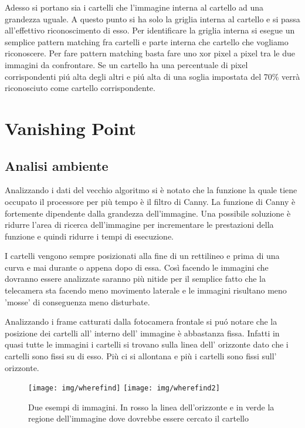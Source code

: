 		Adesso si portano sia i cartelli che l'immagine interna al cartello ad una grandezza uguale. A questo punto si ha solo la griglia interna al cartello e si passa all'effettivo riconoscimento di esso. Per identificare la griglia interna si esegue un semplice pattern matching fra cartelli e parte interna che cartello che vogliamo riconoscere. Per fare pattern matching basta fare uno xor pixel a pixel tra le due immagini da confrontare. Se un cartello ha una percentuale di pixel corrispondenti pi\'u alta degli altri e pi\'u alta di una soglia impostata del 70\% verrà riconosciuto come cartello corrispondente.
		

\section{Vanishing Point}

	\subsection{Analisi ambiente}

		Analizzando i dati del vecchio algoritmo si è notato che la funzione la quale tiene occupato il processore per più tempo è il filtro di Canny. La funzione di Canny è fortemente dipendente dalla grandezza dell'immagine. Una possibile soluzione è ridurre l'area di ricerca dell'immagine per incrementare le prestazioni della funzione e quindi ridurre i tempi di esecuzione.

		I cartelli vengono sempre posizionati alla fine di un rettilineo e prima di una curva e mai durante o appena dopo di essa. Così facendo le immagini che dovranno essere analizzate saranno più nitide per il semplice fatto che la telecamera sta facendo meno movimento laterale e le immagini risultano meno 'mosse' di conseguenza meno disturbate.

		Analizzando i frame catturati dalla fotocamera frontale si pu\'o notare che la posizione dei cartelli all' interno dell' immagine è abbastanza fissa. Infatti in quasi tutte le immagini i cartelli si trovano sulla linea dell' orizzonte dato che i cartelli sono fissi su di esso. Più ci si allontana e più i cartelli sono fissi sull' orizzonte.
		\begin{figure}[!ht]
			\centering
			\texttt{[image: img/wherefind]}
			\texttt{[image: img/wherefind2]}
			\caption[Area ricerca cartello]{Due esempi di immagini. In rosso la linea dell'orizzonte e in verde la regione dell'immagine dove dovrebbe essere cercato il cartello}
		\end{figure}


